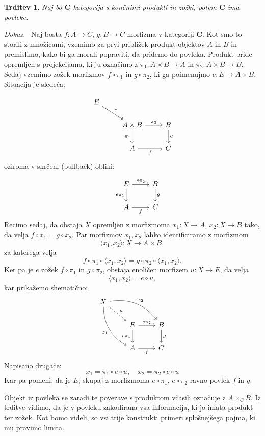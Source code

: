 \documentclass[12pt,a4paper]{book}
\theoremstyle{definition}
\theoremstyle{plain}
\newtheorem{trditev}[definicija]{Trditev}
\newenvironment{dokaz}{\emph{Dokaz.}\ }{\hspace{\fill}{$\Box$}}
\theoremstyle{definition}
\theoremstyle{remark}
\newcommand{\cat}[1]{\textbf{#1}}
\newcommand{\fprod}[1]{\langle #1 \rangle}
\begin{document}
\begin{trditev}
Naj bo $\cat{C}$ kategorija s končnimi produkti in zožki, potem $\cat{C}$ ima povleke.
\end{trditev}
\begin{dokaz}
Naj bosta $f : A \to C$, $g : B \to C$ morfizma v kategoriji $\cat{C}$. Kot smo to storili z množicami, vzemimo za prvi približek produkt objektov $A$ in $B$ in premislimo, kako bi ga morali popraviti, da pridemo do povleka. Produkt pride opremljen s projekcijama, ki ju označimo z $\pi_1 : A \times B \to A$ in $\pi_2 : A \times B \to B$. Sedaj vzemimo zožek morfizmov $f \circ \pi_1$ in $g \circ \pi_2$, ki ga poimenujmo $e : E \to A \times B$. Situacija je sledeča:

$$\begin{tikzcd}
E
\ar[dr, "e"] \\
& A \times B \arrow[r, "\pi_2"] \arrow[d, "\pi_1"']
& B \arrow[d, "g"] \\
& A \arrow[r, "f"']
& C
\end{tikzcd}$$
oziroma v skrčeni (pullback) obliki:

$$\begin{tikzcd}
& E \arrow[r, "e\pi_2"] \arrow[d, "e\pi_1"']
& B \arrow[d, "g"] \\
& A \arrow[r, "f"']
& C
\end{tikzcd}$$
Recimo sedaj, da obstaja $X$ opremljen z morfizmoma $x_1 : X \to A$, $x_2 : X \to B$ tako, da velja $f \circ x_1 = g \circ x_2$. Par morfizmov $x_1,x_2$ lahko identificiramo z morfizmom
$$\langle x_1,x_2 \rangle : X \to A \times B,$$
za katerega velja
$$f \circ \pi_1 \circ \fprod{x_1,x_2} = g \circ \pi_2 \circ \fprod{x_1,x_2}.$$
Ker pa je $e$ zožek $f \circ \pi_1$ in $g \circ \pi_2$, obstaja enoličen morfizem $u : X \to E$, da velja 
$$\fprod{x_1,x_2} = e \circ u,$$
kar prikažemo shematično:
%
$$\begin{tikzcd}
X \ar[ddr, bend right, "x_1"'] \ar[drr, bend left, "x_2"] \ar[dr, dashed, "u"] \\
& E \arrow[r, "e\pi_2"] \arrow[d, "e\pi_1"']
& B \arrow[d, "g"] \\
& A \arrow[r, "f"']
& C
\end{tikzcd}$$
%
Napisano drugače:
$$x_1 = \pi_1 \circ e \circ u, \quad x_2 = \pi_2 \circ e \circ u$$
Kar pa pomeni, da je $E$, skupaj z morfizmoma $e \circ \pi_1$, $e \circ \pi_2$ ravno povlek $f$ in $g$.
\end{dokaz}

Objekt iz povleka se zaradi te povezave s produktom včasih označuje z $A \times_C B$.
Iz trditve vidimo, da je v povleku zakodirana vsa informacija, ki jo imata produkt ter zožek. Kot bomo videli, so vsi trije konstrukti primeri splošnejšega pojma, ki mu pravimo limita.
\end{document}
